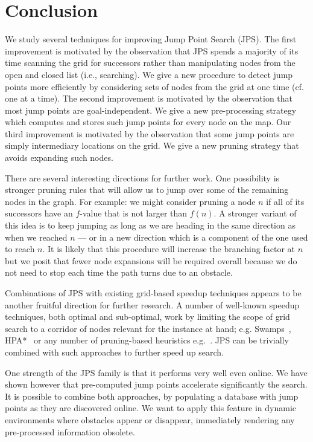 \section{Conclusion}
\label{sec::conclusion}

We study several techniques for improving Jump Point Search (JPS).  
The first improvement is motivated by the observation that JPS spends
a majority of its time scanning the grid for successors rather than
manipulating nodes from the open and closed list (i.e., searching). 
We give a new procedure to detect jump points more efficiently
by considering sets of nodes from the grid at one time (cf. one at a time).
The second improvement is motivated by the observation that most jump
points are goal-independent. We give a new pre-processing strategy
which computes and stores such jump points for every node on the map.  
Our third improvement is motivated by the observation that some
jump points are simply intermediary locations on the grid. We give a new 
pruning strategy that avoids expanding such nodes.

There are several interesting directions for further work. One possibility is
stronger pruning rules that will allow us to jump over some of the remaining
nodes in the graph. For example: we might consider %
pruning a node $n$ if all of its successors have
an $f$-value that is not larger than $f(n)$. A stronger variant of this idea
is to keep jumping as long as we are heading in the same direction as when we
reached $n$ --- or in a new direction which is a component of the one used to
reach $n$. It is likely that this procedure will increase the branching factor
at $n$ but we posit that fewer node expansions will be required overall because
we do not need to stop each time the path turns due to an obstacle.

Combinations of JPS with existing grid-based speedup 
techniques appears to be another fruitful direction for further research. 
A number of well-known speedup techniques, both optimal and sub-optimal,
work by limiting the scope of grid search to a corridor of nodes relevant
for the instance at hand; e.g. Swamps~\cite{pochter10}, HPA{*}~\cite{botea04}
or any number of pruning-based heuristics e.g.~\cite{bjornsson06,goldenberg10}.
JPS can be trivially combined with such approaches to further speed up search.

One strength of the JPS family is that it performs very well even online.  We
have shown however that pre-computed jump points accelerate significantly the
search.  It is possible to combine both approaches, by populating a database
with jump points as they are discovered online.  We want to apply this feature
in dynamic environments where obstacles appear or disappear, immediately
rendering any pre-processed information obsolete.

